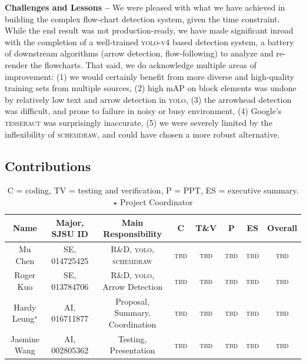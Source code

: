 \documentclass[10pt]{article}
\begin{document}
{\bf Challenges and Lessons --}\phantom{i}
We were pleased with what we have achieved in building the complex
flow-chart detection system, given the time constraint.
While the end result was not production-ready, we have made
significant inroad with the completion of a well-trained \textsc{yolo-v4}
based detection system, a battery of downstream algorithms (arrow detection,
flow-following) to analyze and re-render the flowcharts.
That said, we do acknowledge multiple areas of
improvement: (1) we would certainly benefit from more diverse and
high-quality training sets from multiple sources,
(2) high mAP on block elements was undone by relatively
low text and arrow detection in \textsc{yolo},
(3) the arrowhead detection was difficult, and prone to failure in noisy
or busy environment, (4)
Google's \textsc{tesseract} was surprisingly inaccurate, (5) we were
severely limited by the inflexibility of \textsc{schemdraw}, and could have
chosen a more robust alternative.


\pagebreak

\subsection*{Contributions}

\begin{table}[htbp]
\centering
\begin{tabular}{|c|c|c|c|c|c|c|c|}
\hline
Name & Major, SJSU ID & Main Responsibility & \textsc{C} &
	\textsc{T\&V} & \textsc{P} & \textsc{ES} & Overall \\
\hline
Mu Chen & SE, 014725425 & R\&D, \textsc{yolo}, \textsc{schemdraw} & \textsc{tbd} & \textsc{tbd} & \textsc{tbd} & \textsc{tbd} & \textsc{tbd} \\
Roger Kuo & SE, 013784706 & R\&D, \textsc{yolo}, Arrow Detection & \textsc{tbd} & \textsc{tbd} & \textsc{tbd} & \textsc{tbd} & \textsc{tbd} \\
Hardy Leung${}^\star$ & AI, 016711877 &
Proposal, Summary, Coordination & \textsc{tbd} & \textsc{tbd} & \textsc{tbd} & \textsc{tbd} & \textsc{tbd} \\
Jasmine Wang & AI, 002805362 & Testing, Presentation & \textsc{tbd} & \textsc{tbd} & \textsc{tbd} & \textsc{tbd} & \textsc{tbd} \\ \hline
\end{tabular}
\caption{\textsc{C} = coding, \textsc{TV} =
testing and verification,
\textsc{P} = PPT, \textsc{ES} = executive summary. $\star$ Project Coordinator}
\end{table}

% 
% 
\end{document}
